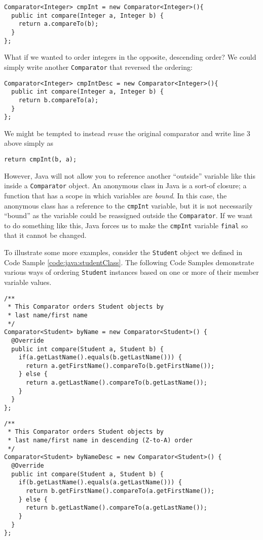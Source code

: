 \begin{verbatim}
Comparator<Integer> cmpInt = new Comparator<Integer>(){
  public int compare(Integer a, Integer b) {
    return a.compareTo(b);
  }
};
\end{verbatim}

What if we wanted to order integers in the opposite, descending order?  
We could simply write another \texttt{Comparator} that reversed
the ordering:

\begin{verbatim}
Comparator<Integer> cmpIntDesc = new Comparator<Integer>(){
  public int compare(Integer a, Integer b) {
    return b.compareTo(a);
  }
};
\end{verbatim}

We might be tempted to instead \emph{reuse} the original comparator and
write line 3 above simply as 

\texttt{return cmpInt(b, a);}

However, Java will not allow you to reference another ``outside'' variable
like this inside a \texttt{Comparator} object.  An anonymous
class in Java is a sort-of \gls{closure}; a function that has a scope
in which variables are \emph{bound}.  In this case, the anonymous class
has a reference to the \texttt{cmpInt} variable, but it is
not necessarily ``bound'' as the variable could be reassigned outside
the \texttt{Comparator}.  If we want to do something like this, 
Java forces us to make the \texttt{cmpInt} variable 
\texttt{final} so that it cannot be changed.

To illustrate some more examples, consider the \texttt{Student} 
object we defined in Code Sample \ref{code:java:studentClass}.  The following 
Code Samples demonstrate various ways of ordering \texttt{Student} 
instances based on one or more of their member variable values.

\begin{verbatim}
/**
 * This Comparator orders Student objects by 
 * last name/first name
 */
Comparator<Student> byName = new Comparator<Student>() {
  @Override
  public int compare(Student a, Student b) {
    if(a.getLastName().equals(b.getLastName())) {
      return a.getFirstName().compareTo(b.getFirstName());
    } else {
      return a.getLastName().compareTo(b.getLastName());
    }
  }
};
\end{verbatim}

\begin{verbatim}
/**
 * This Comparator orders Student objects by 
 * last name/first name in descending (Z-to-A) order
 */
Comparator<Student> byNameDesc = new Comparator<Student>() {
  @Override
  public int compare(Student a, Student b) {
    if(b.getLastName().equals(a.getLastName())) {
      return b.getFirstName().compareTo(a.getFirstName());
    } else {
      return b.getLastName().compareTo(a.getLastName());
    }
  }
};
\end{verbatim}

